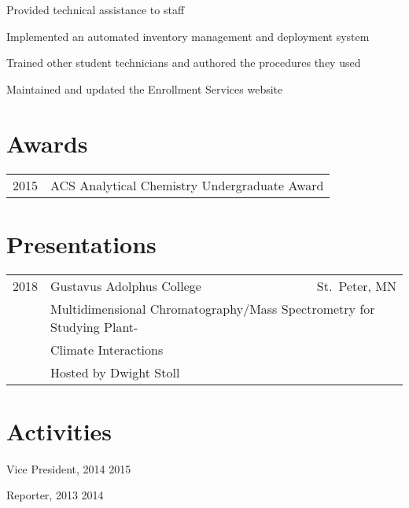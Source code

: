 \documentclass[]{deedy-resume-openfont}
\begin{document}
\newpage
\begin{minipage}[t]{0.7\textwidth}

\begin{tightemize}
\item Provided technical assistance to staff
\item Implemented an automated inventory management and deployment system
\item Trained other student technicians and authored the procedures they used
\item Maintained and updated the Enrollment Services website
\end{tightemize}

\section{Awards}
\begin{tabular}{rl}
2015	     & ACS Analytical Chemistry Undergraduate Award\\
\end{tabular}
\sectionsep

\section{Presentations}
\begin{tabular}{rlr}
2018    & Gustavus Adolphus College & St.\ Peter, MN \\
& \multicolumn{2}{l}{Multidimensional Chromatography/Mass Spectrometry for
    Studying Plant-}\\
& \multicolumn{2}{l}{Climate Interactions}\\
& \multicolumn{2}{l}{Hosted by Dwight Stoll}
\end{tabular}
\sectionsep

\section{Activities}
\begin{tightemize}
\item Vice President, 2014 \textendash{} 2015
\item Reporter, 2013 \textendash{} 2014
\end{tightemize}


\end{minipage}
\end{document}
